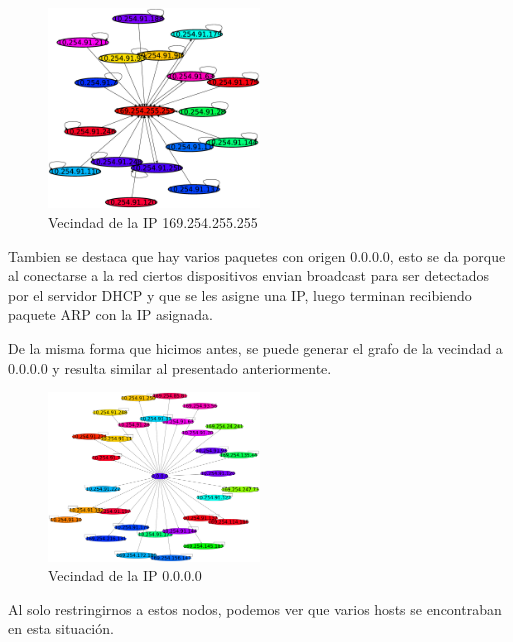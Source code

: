 \begin{figure}[!htb]
		\centering
		\includegraphics[width=0.5\textwidth]{img/graph/escenario_3/169254_aislado.eps}
		\caption{Vecindad de la IP 169.254.255.255}
		\label{fig:v1_escenario3}
\end{figure}
	\par Tambien se destaca que hay varios paquetes con origen 0.0.0.0, esto se da porque  al conectarse a la red ciertos dispositivos  envian broadcast para ser detectados por el servidor DHCP y que se les asigne una IP, luego terminan recibiendo paquete ARP con la IP asignada.
    
    \par De la misma forma que hicimos antes, se puede generar el grafo de la vecindad a 0.0.0.0 y resulta similar al presentado anteriormente.
    
\begin{figure}[!htb]
		\centering
		\includegraphics[width=0.5\textwidth]{img/graph/escenario_3/0000_aislado.eps}
		\caption{Vecindad de la IP 0.0.0.0}
		\label{fig:0_escenario3}
\end{figure}

	\par Al solo restringirnos a estos nodos, podemos ver que varios hosts se encontraban en esta situación.
\vspace{6 mm}

